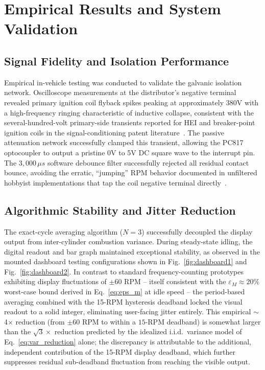 \documentclass[journal, twocolumn]{IEEEtran}
\begin{document}
\section{Empirical Results and System Validation}

\subsection{Signal Fidelity and Isolation Performance}
Empirical in-vehicle testing was conducted to validate the galvanic isolation network. Oscilloscope measurements at the distributor's negative terminal revealed primary ignition coil flyback spikes peaking at approximately 380V with a high-frequency ringing characteristic of inductive collapse, consistent with the several-hundred-volt primary-side transients reported for HEI and breaker-point ignition coils in the signal-conditioning patent literature~\cite{signalcond1990,twocycletach1988}. The passive attenuation network successfully clamped this transient, allowing the PC817 optocoupler to output a pristine 0V to 5V DC square wave to the interrupt pin. The $3{,}000\,\mu s$ software debounce filter successfully rejected all residual contact bounce, avoiding the erratic, ``jumping'' RPM behavior documented in unfiltered hobbyist implementations that tap the coil negative terminal directly~\cite{arduinoforum2023}.

\subsection{Algorithmic Stability and Jitter Reduction}
The exact-cycle averaging algorithm ($N=3$) successfully decoupled the display output from inter-cylinder combustion variance. During steady-state idling, the digital readout and bar graph maintained exceptional stability, as observed in the mounted dashboard testing configurations shown in Fig.~\ref{fig:dashboard1} and Fig.~\ref{fig:dashboard2}. In contrast to standard frequency-counting prototypes exhibiting display fluctuations of $\pm 60$ RPM -- itself consistent with the $\varepsilon_M \approx 20\%$ worst-case bound derived in Eq.~\eqref{eq:eps_m} at idle speed -- the period-based averaging combined with the 15-RPM hysteresis deadband locked the visual readout to a solid integer, eliminating user-facing jitter entirely. This empirical $\sim$4$\times$ reduction (from $\pm60$ RPM to within a $15$-RPM deadband) is somewhat larger than the $\sqrt{3}\times$ reduction predicted by the idealized i.i.d.\ variance model of Eq.~\eqref{eq:var_reduction} alone; the discrepancy is attributable to the additional, independent contribution of the 15-RPM display deadband, which further suppresses residual sub-deadband fluctuation from reaching the visible output.
\end{document}
